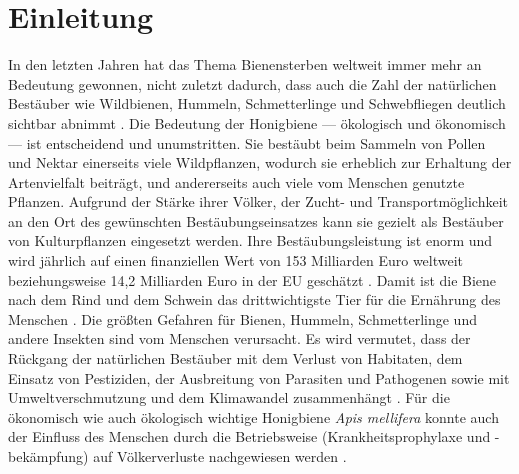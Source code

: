 \section{Einleitung}

In den letzten Jahren hat das Thema Bienensterben weltweit immer mehr an Bedeutung gewonnen, nicht zuletzt dadurch, dass auch die Zahl der natürlichen Bestäuber wie Wildbienen, Hummeln, Schmetterlinge und Schwebfliegen deutlich sichtbar abnimmt \citep{hallmann2017}. Die Bedeutung der Honigbiene --- ökologisch und ökonomisch --- ist entscheidend und unumstritten. Sie bestäubt beim Sammeln von Pollen und Nektar einerseits viele Wildpflanzen, wodurch sie erheblich zur Erhaltung der Artenvielfalt beiträgt, und andererseits auch viele vom Menschen genutzte Pflanzen. Aufgrund der Stärke ihrer Völker, der Zucht- und Transportmöglichkeit an den Ort des gewünschten Bestäubungseinsatzes kann sie gezielt als Bestäuber von Kulturpflanzen eingesetzt werden. Ihre Bestäubungsleistung ist enorm und wird jährlich auf einen finanziellen Wert von 153 Milliarden Euro weltweit beziehungsweise 14,2 Milliarden Euro in der EU geschätzt \citep{gallai2009}. Damit ist die Biene nach dem Rind und dem Schwein das drittwichtigste Tier für die Ernährung des Menschen \citep{kearns1998}.
\newline
Die größten Gefahren für Bienen, Hummeln, Schmetterlinge und andere Insekten sind vom Menschen verursacht. Es wird vermutet, dass der Rückgang der natürlichen Bestäuber mit dem Verlust von Habitaten, dem Einsatz von Pestiziden, der Ausbreitung von Parasiten und Pathogenen sowie mit Umweltverschmutzung und dem Klimawandel zusammenhängt \citep{biesmeijer2006, cameron2011, vanengelsdorp2011, cornman2012, goulson2013, steinhauer2014, steinhauer2018, vanderzee2014, clermont2015, clermont2015, woodcock2016, belsky2019}. Für die ökonomisch wie auch ökologisch wichtige Honigbiene \textit{Apis mellifera} konnte auch der Einfluss des Menschen durch die Betriebsweise (Krankheitsprophylaxe und -bekämpfung) auf Völkerverluste nachgewiesen werden \citep{jacques2017}.
\newline
